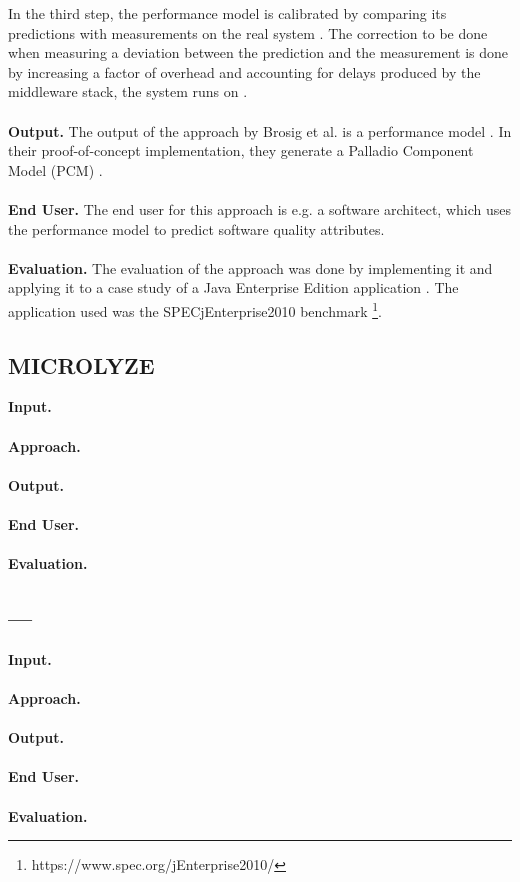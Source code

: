In the third step, the performance model is calibrated by comparing its predictions with measurements on the real system \cite{Brosig2011}.
The correction to be done when measuring a deviation between the prediction and the measurement is done by increasing a factor of overhead and accounting for delays produced by the middleware stack, the system runs on \cite{Brosig2011}.
\\ \\
\textbf{Output.}
The output of the approach by Brosig et al. is a performance model \cite{Brosig2011}.
In their proof-of-concept implementation, they generate a Palladio Component Model (PCM) \cite{Brosig2011}.
\\ \\
\textbf{End User.}
The end user for this approach is e.g. a software architect, which uses the performance model to predict software quality attributes.
\\ \\
\textbf{Evaluation.}
The evaluation of the approach was done by implementing it and applying it to a case study of a Java Enterprise Edition application \cite{Brosig2011}.
The application used was the SPECjEnterprise2010 benchmark \footnote{https://www.spec.org/jEnterprise2010/}.


\subsection{MICROLYZE \cite{Kleehaus2018}}
\label{sec:Results:Microlyze}
\textbf{Input.}
\\ \\
\textbf{Approach.}
\\ \\
\textbf{Output.}
\\ \\
\textbf{End User.}
\\ \\
\textbf{Evaluation.}

\subsection{--- \cite{Mayer2018}}
\label{sec:Results:Mayer}
\textbf{Input.}
\\ \\
\textbf{Approach.}
\\ \\
\textbf{Output.}
\\ \\
\textbf{End User.}
\\ \\
\textbf{Evaluation.}

